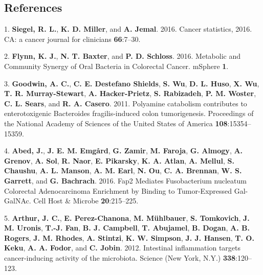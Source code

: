 \documentclass[12pt,]{article}
\begin{document}
\newpage

\subsection{References}\label{references}

\hypertarget{refs}{}
\hypertarget{ref-siegel_cancer_2016}{}
1. \textbf{Siegel, R. L.}, \textbf{K. D. Miller}, and \textbf{A. Jemal}.
2016. Cancer statistics, 2016. CA: a cancer journal for clinicians
\textbf{66}:7--30.

\hypertarget{ref-flynn_metabolic_2016}{}
2. \textbf{Flynn, K. J.}, \textbf{N. T. Baxter}, and \textbf{P. D.
Schloss}. 2016. Metabolic and Community Synergy of Oral Bacteria in
Colorectal Cancer. mSphere \textbf{1}.

\hypertarget{ref-goodwin_polyamine_2011}{}
3. \textbf{Goodwin, A. C.}, \textbf{C. E. Destefano Shields}, \textbf{S.
Wu}, \textbf{D. L. Huso}, \textbf{X. Wu}, \textbf{T. R. Murray-Stewart},
\textbf{A. Hacker-Prietz}, \textbf{S. Rabizadeh}, \textbf{P. M. Woster},
\textbf{C. L. Sears}, and \textbf{R. A. Casero}. 2011. Polyamine
catabolism contributes to enterotoxigenic Bacteroides fragilis-induced
colon tumorigenesis. Proceedings of the National Academy of Sciences of
the United States of America \textbf{108}:15354--15359.

\hypertarget{ref-abed_fap2_2016}{}
4. \textbf{Abed, J.}, \textbf{J. E. M. Emgård}, \textbf{G. Zamir},
\textbf{M. Faroja}, \textbf{G. Almogy}, \textbf{A. Grenov}, \textbf{A.
Sol}, \textbf{R. Naor}, \textbf{E. Pikarsky}, \textbf{K. A. Atlan},
\textbf{A. Mellul}, \textbf{S. Chaushu}, \textbf{A. L. Manson},
\textbf{A. M. Earl}, \textbf{N. Ou}, \textbf{C. A. Brennan}, \textbf{W.
S. Garrett}, and \textbf{G. Bachrach}. 2016. Fap2 Mediates Fusobacterium
nucleatum Colorectal Adenocarcinoma Enrichment by Binding to
Tumor-Expressed Gal-GalNAc. Cell Host \& Microbe \textbf{20}:215--225.

\hypertarget{ref-arthur_intestinal_2012}{}
5. \textbf{Arthur, J. C.}, \textbf{E. Perez-Chanona}, \textbf{M.
Mühlbauer}, \textbf{S. Tomkovich}, \textbf{J. M. Uronis}, \textbf{T.-J.
Fan}, \textbf{B. J. Campbell}, \textbf{T. Abujamel}, \textbf{B. Dogan},
\textbf{A. B. Rogers}, \textbf{J. M. Rhodes}, \textbf{A. Stintzi},
\textbf{K. W. Simpson}, \textbf{J. J. Hansen}, \textbf{T. O. Keku},
\textbf{A. A. Fodor}, and \textbf{C. Jobin}. 2012. Intestinal
inflammation targets cancer-inducing activity of the microbiota. Science
(New York, N.Y.) \textbf{338}:120--123.
\end{document}

